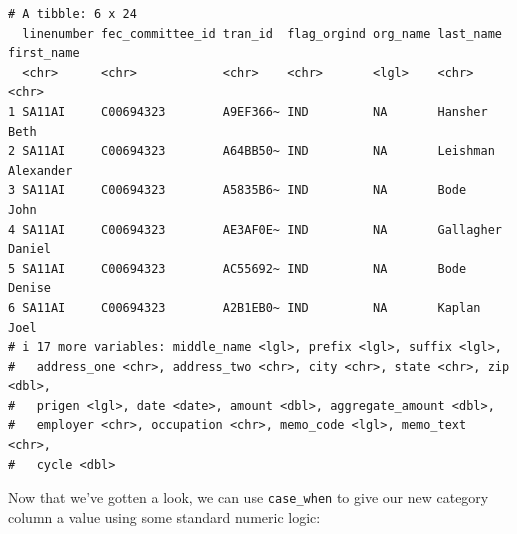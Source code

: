 \documentclass[
  letterpaper,
  DIV=11,
  numbers=noendperiod]{scrreprt}
\newenvironment{Shaded}{\begin{snugshade}}{\end{snugshade}}
\newcommand{\AttributeTok}[1]{\textcolor[rgb]{0.40,0.45,0.13}{#1}}
\newcommand{\DecValTok}[1]{\textcolor[rgb]{0.68,0.00,0.00}{#1}}
\newcommand{\FunctionTok}[1]{\textcolor[rgb]{0.28,0.35,0.67}{#1}}
\newcommand{\NormalTok}[1]{\textcolor[rgb]{0.00,0.23,0.31}{#1}}
\newcommand{\OtherTok}[1]{\textcolor[rgb]{0.00,0.23,0.31}{#1}}
\newcommand{\SpecialCharTok}[1]{\textcolor[rgb]{0.37,0.37,0.37}{#1}}
\newcommand{\StringTok}[1]{\textcolor[rgb]{0.13,0.47,0.30}{#1}}
\begin{document}
\begin{verbatim}
# A tibble: 6 x 24
  linenumber fec_committee_id tran_id  flag_orgind org_name last_name first_name
  <chr>      <chr>            <chr>    <chr>       <lgl>    <chr>     <chr>     
1 SA11AI     C00694323        A9EF366~ IND         NA       Hansher   Beth      
2 SA11AI     C00694323        A64BB50~ IND         NA       Leishman  Alexander 
3 SA11AI     C00694323        A5835B6~ IND         NA       Bode      John      
4 SA11AI     C00694323        AE3AF0E~ IND         NA       Gallagher Daniel    
5 SA11AI     C00694323        AC55692~ IND         NA       Bode      Denise    
6 SA11AI     C00694323        A2B1EB0~ IND         NA       Kaplan    Joel      
# i 17 more variables: middle_name <lgl>, prefix <lgl>, suffix <lgl>,
#   address_one <chr>, address_two <chr>, city <chr>, state <chr>, zip <dbl>,
#   prigen <lgl>, date <date>, amount <dbl>, aggregate_amount <dbl>,
#   employer <chr>, occupation <chr>, memo_code <lgl>, memo_text <chr>,
#   cycle <dbl>
\end{verbatim}

Now that we've gotten a look, we can use \texttt{case\_when} to give our
new category column a value using some standard numeric logic:

\begin{Shaded}
\end{Shaded}
\end{document}
